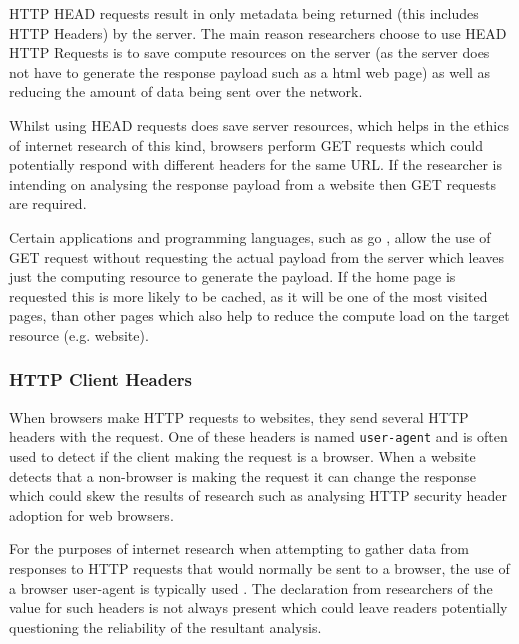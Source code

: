 \documentclass{mscreport}
\begin{document}
\vspace{0.3cm} \noindent
HTTP HEAD requests result in only metadata being returned (this includes HTTP Headers) by the server. The main reason researchers choose to use HEAD HTTP Requests \cite{Amann2017-co} is to save compute resources on the server (as the server does not have to generate the response payload such as a html web page) as well as reducing the amount of data being sent over the network.

\vspace{0.3cm} \noindent
Whilst using HEAD requests does save server resources, which helps in the ethics of internet research of this kind, browsers perform GET requests which could potentially respond with different headers for the same URL. If the researcher is intending on analysing the response payload from a website then GET requests \cite{Chen2016-dl,Kumar2017-qw} are required.

\vspace{0.3cm} \noindent
Certain applications and programming languages, such as go \cite{noauthor_undated-lc}, allow the use of GET request without requesting the actual payload from the server which leaves just the computing resource to generate the payload. If the home page is requested this is more likely to be cached, as it will be one of the most visited pages, than other pages which also help to reduce the compute load on the target resource (e.g. website).

\subsubsection{HTTP Client Headers}

When browsers make HTTP requests to websites, they send several HTTP headers with the request. One of these headers is named \texttt{user-agent} and is often used to detect if the client making the request is a browser. When a website detects that a non-browser is making the request it can change the response which could skew the results of research such as analysing HTTP security header adoption for web browsers.

\vspace{0.3cm} \noindent
For the purposes of internet research when attempting to gather data from responses to HTTP requests that would normally be sent to a browser, the use of a browser user-agent is typically used \cite{Buchanan2018-xz, Patil2017-bg,Ying2016-ag,Lavrenovs2018-dl,Poteat2021-zr}. The declaration from researchers of the value for such headers is not always present \cite{Amann2017-co} which could leave readers potentially questioning the reliability of the resultant analysis.
\end{document}

